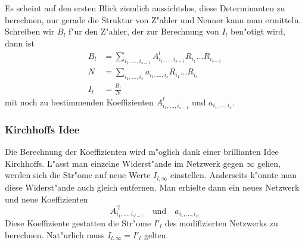 Es scheint auf den ersten Blick ziemlich aussichtslos, diese
Determinanten zu berechnen, nur gerade die Struktur von Z"ahler
und Nenner kann man ermitteln. Schreiben wir $B_l$ f"ur den 
Z"ahler, der zur Berechnung von $I_l$ ben"otigt wird, dann ist
\begin{align*}
B_l&=\sum_{i_1,\dots,i_{s-1}}A^l_{i_1,\dots,i_{s-1}}R_{i_1}\dots R_{i_{s-1}}\\
N&=\sum_{i_1,\dots,i_s}a_{i_1,\dots,i_s}R_{i_1}\dots R_{i_s}\\
I_l&=\frac{B_l}{N}
\end{align*}
mit noch zu bestimmenden Koeffizienten $A_{i_1,\dots,i_{s-1}}^l$
und $a_{i_1,\dots,i_s}$.

\subsubsection{Kirchhoffs Idee}
Die Berechnung der Koeffizienten wird m"oglich dank einer brillianten
Idee Kirchhoffs. L"asst man einzelne Widerst"ande im Netzwerk gegen
$\infty$ gehen, werden sich die Str"ome auf neue Werte $I_{l,\infty}$
einstellen. Anderseits k"onnte man diese Widerst"ande auch gleich entfernen.
Man erhielte dann ein neues Netzwerk und neue Koeffizienten
\[
A_{i_1,\dots,i_{s'-1}}^{\prime l}
\quad
\text{und}
\quad
a_{i_1,\dots,i_{s'}}
\]
Diese Koeffiziente gestatten die Str"ome $I'_l$ des modifizierten Netzwerks
zu berechnen. Nat"urlich muss $I_{l,\infty}=I'_l$ gelten.

